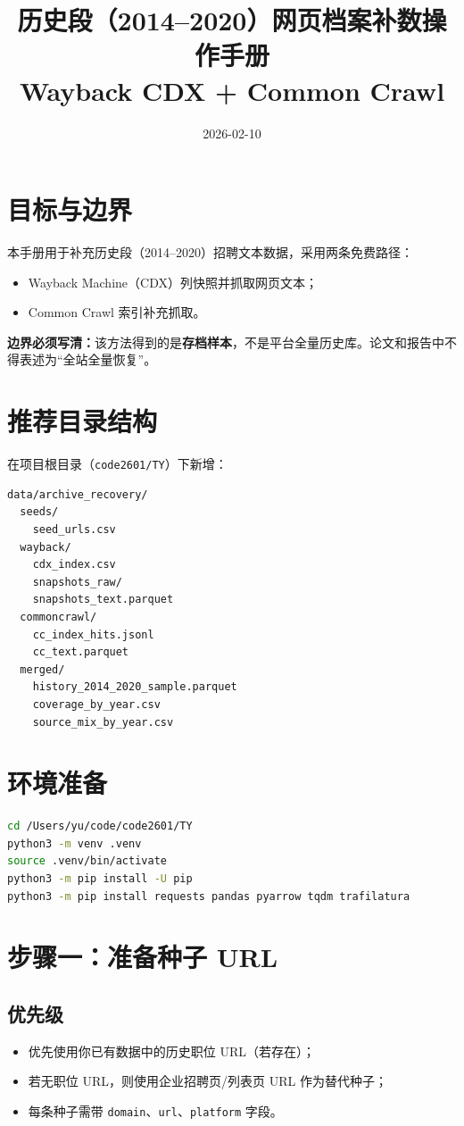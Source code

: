 \documentclass[12pt,a4paper]{ctexart}
\title{历史段（2014--2020）网页档案补数操作手册\\Wayback CDX + Common Crawl}
\author{}
\date{2026-02-10}
\begin{document}
\maketitle

\section{目标与边界}
本手册用于补充历史段（2014--2020）招聘文本数据，采用两条免费路径：
\begin{itemize}
    \item Wayback Machine（CDX）列快照并抓取网页文本；
    \item Common Crawl 索引补充抓取。
\end{itemize}

\textbf{边界必须写清：}该方法得到的是\textbf{存档样本}，不是平台全量历史库。论文和报告中不得表述为“全站全量恢复”。

\section{推荐目录结构}
在项目根目录（\texttt{code2601/TY}）下新增：
\begin{lstlisting}[language=bash]
data/archive_recovery/
  seeds/
    seed_urls.csv
  wayback/
    cdx_index.csv
    snapshots_raw/
    snapshots_text.parquet
  commoncrawl/
    cc_index_hits.jsonl
    cc_text.parquet
  merged/
    history_2014_2020_sample.parquet
    coverage_by_year.csv
    source_mix_by_year.csv
\end{lstlisting}

\section{环境准备}
\begin{lstlisting}[language=bash]
cd /Users/yu/code/code2601/TY
python3 -m venv .venv
source .venv/bin/activate
python3 -m pip install -U pip
python3 -m pip install requests pandas pyarrow tqdm trafilatura
\end{lstlisting}

\section{步骤一：准备种子 URL}
\subsection{优先级}
\begin{itemize}
    \item 优先使用你已有数据中的历史职位 URL（若存在）；
    \item 若无职位 URL，则使用企业招聘页/列表页 URL 作为替代种子；
    \item 每条种子需带 \texttt{domain}、\texttt{url}、\texttt{platform} 字段。
\end{itemize}
\end{document}
